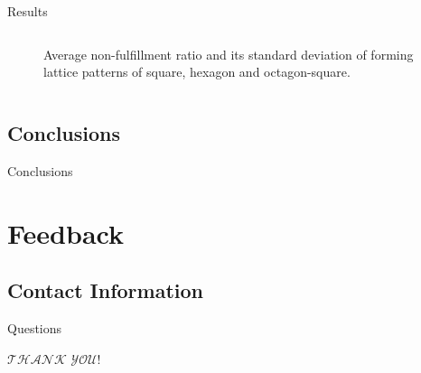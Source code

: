 \documentclass[10pt]{beamer}
\newcommand{\chref}[2]{%
  \href{#1}{{\usebeamercolor[bg]{AAUsimple}#2}}%
}
\begin{document}
\begin{frame}{Results}{}
\begin{columns}[T]
\begin{column}{.48\textwidth}
\begin{figure}
          \caption{Average non-fulfillment ratio and its standard
            deviation of forming lattice patterns of square, hexagon
            and octagon-square.}
        \end{figure}
      \end{column}%
    \end{columns}
\end{frame}

\subsection{Conclusions}
\begin{frame}{Conclusions}{}
\begin{block}{}
   
\end{block}
\end{frame}


\section{Feedback}

\subsection{Contact Information}
\begin{frame}{Questions}{}
  \begin{center}
    \textcolor{scred}{\LARGE $\mathscr{THANK}$ $\mathscr{YOU}!$}
  \end{center}
\end{frame}
\end{document}
